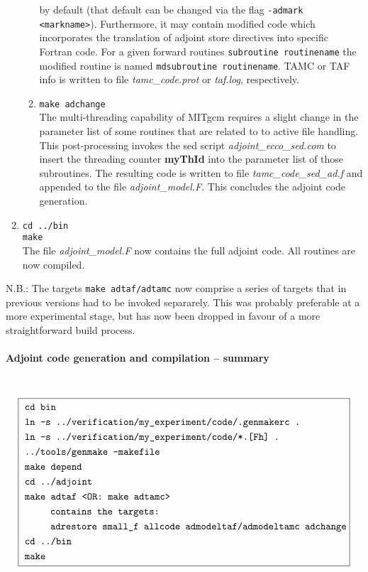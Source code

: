 \begin{enumerate}
\begin{enumerate}
by default (that default can be changed via the flag 
{\tt -admark <markname>}).
Furthermore, it may contain modified code which
incorporates the translation of adjoint store directives
into specific Fortran code.
For a given forward routines {\tt subroutine routinename}
the modified routine is named {\tt mdsubroutine routinename}.
TAMC or TAF info is written to file
{\it tamc\_code.prot} or {\it taf.log}, respectively.
%
\item
{\tt make adchange} \\
The multi-threading capability of MITgcm requires a slight
change in the parameter list of some routines that are related to
to active file handling.
This post-processing invokes the sed script {\it adjoint\_ecco\_sed.com}
to insert the threading counter {\bf myThId} into the parameter list
of those subroutines.
The resulting code is written to file {\it tamc\_code\_sed\_ad.f}
and appended to the file {\it adjoint\_model.F}.
This concludes the adjoint code generation.
%
\end{enumerate}
%
\item
{\tt cd ../bin} \\
{\tt make} \\
The file {\it adjoint\_model.F} now contains the full adjoint code.
All routines are now compiled.
%
\end{enumerate}

N.B.: The targets {\tt make adtaf/adtamc} now comprise a
series of targets that in previous versions had to be
invoked separarely. This was probably preferable at a more
experimental stage, but has now been dropped in favour of
a more straightforward build process.


\paragraph{Adjoint code generation and compilation -- summary}
~ \\

{\small
\[
\boxed{
\begin{split}
 ~ & \mbox{\tt cd bin} \\
 ~ & \mbox{\tt ln -s ../verification/my\_experiment/code/.genmakerc .} \\
 ~ & \mbox{\tt ln -s ../verification/my\_experiment/code/*.[Fh] .} \\
 ~ & \mbox{\tt ../tools/genmake -makefile} \\
 ~ & \mbox{\tt make depend} \\
 ~ & \mbox{\tt cd ../adjoint} \\
 ~ & \mbox{\tt make adtaf <OR: make adtamc>} \\
 ~ & \hspace*{6ex} \mbox{\tt                 contains the targets:} \\
 ~ & \hspace*{6ex} \mbox{\tt                 adrestore small\_f allcode admodeltaf/admodeltamc adchange} \\
 ~ & \mbox{\tt cd ../bin} \\
 ~ & \mbox{\tt make} \\
\end{split}
}
\]
}

